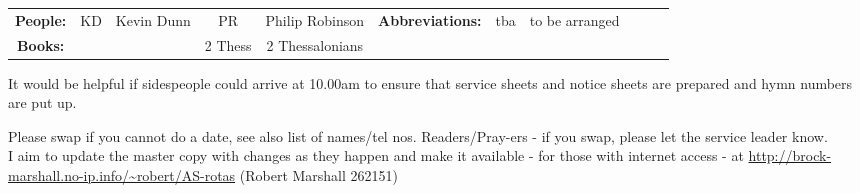 \documentclass[10pt]{article}
\begin{document}
\begin{center}
\vspace{1em}
\begin{tabular}{|c|c|c|c|c|c|c|c|c|c|c|}\hline
{\bf People: } &
KD & Kevin Dunn &
PR & Philip Robinson &
{\bf Abbreviations:}
& tba & to be arranged \\
 {\bf Books: }  &  &   & 2 Thess & 2 Thessalonians
&   &  & 
\\ %
     \hline
  \end{tabular}
\end{center}
\begin{minipage}{0.7\textwidth}
{\footnotesize It would be helpful if sidespeople 
could arrive at 10.00am to ensure that service sheets and notice sheets are 
prepared and hymn numbers are put up.

Please swap if you cannot do a date, see also list of names/tel nos.
Readers/Pray-ers - if you swap, please let the service leader know.\\
I aim to update the master copy with changes as they
happen and make it available - for those with internet access
\linebreak - at
\url{http://brock-marshall.no-ip.info/~robert/AS-rotas}
(Robert Marshall 262151)}
\end{minipage}
\end{document}
